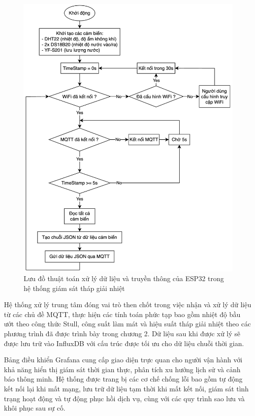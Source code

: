\documentclass[../main.tex]{subfiles}
\begin{document}
\begin{figure}[H]
    \centering
    \includegraphics[width=1\textwidth]{../Hinhve/esp_block.png}
    \caption{Lưu đồ thuật toán xử lý dữ liệu và truyền thông của ESP32 trong hệ thống giám sát tháp giải nhiệt}
    \label{fig:system_block_diagram}
\end{figure}

Hệ thống xử lý trung tâm đóng vai trò then chốt trong việc nhận và xử lý dữ liệu từ các chủ đề MQTT, thực hiện các tính toán phức tạp bao gồm nhiệt độ bầu ướt theo công thức Stull, công suất làm mát và hiệu suất tháp giải nhiệt theo các phương trình đã được trình bày trong chương 2. Dữ liệu sau khi được xử lý sẽ được lưu trữ vào InfluxDB với cấu trúc được tối ưu cho dữ liệu chuỗi thời gian.

Bảng điều khiển Grafana cung cấp giao diện trực quan cho người vận hành với khả năng hiển thị giám sát thời gian thực, phân tích xu hướng lịch sử và cảnh báo thông minh. Hệ thống được trang bị các cơ chế chống lỗi bao gồm tự động kết nối lại khi mất mạng, lưu trữ dữ liệu tạm thời khi mất kết nối, giám sát tình trạng hoạt động và tự động phục hồi dịch vụ, cùng với các quy trình sao lưu và khôi phục sau sự cố.
\end{document}
